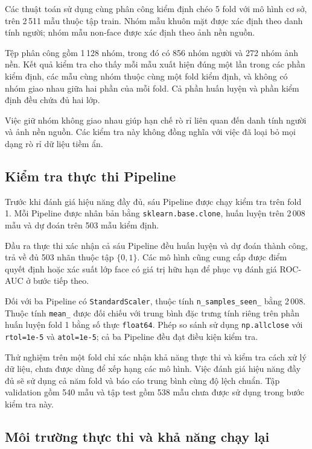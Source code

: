 \documentclass[12pt,a4paper,oneside]{report}
\begin{document}
Các thuật toán sử dụng cùng phân công kiểm định chéo
5 fold với mô hình cơ sở, trên 2\,511 mẫu thuộc tập train.
Nhóm mẫu khuôn mặt được xác định theo danh tính người;
nhóm mẫu non-face được xác định theo ảnh nền nguồn.

Tệp phân công gồm 1\,128 nhóm, trong đó có 856 nhóm người
và 272 nhóm ảnh nền. Kết quả kiểm tra cho thấy mỗi mẫu
xuất hiện đúng một lần trong các phần kiểm định,
các mẫu cùng nhóm thuộc cùng một fold kiểm định,
và không có nhóm giao nhau giữa hai phần của mỗi fold.
Cả phần huấn luyện và phần kiểm định đều chứa đủ hai lớp.

Việc giữ nhóm không giao nhau giúp hạn chế rò rỉ liên quan
đến danh tính người và ảnh nền nguồn. Các kiểm tra này
không đồng nghĩa với việc đã loại bỏ mọi dạng rò rỉ
dữ liệu tiềm ẩn.

\subsection{Kiểm tra thực thi Pipeline}

Trước khi đánh giá hiệu năng đầy đủ, sáu Pipeline được
chạy kiểm tra trên fold 1. Mỗi Pipeline được nhân bản
bằng \texttt{sklearn.base.clone}, huấn luyện trên
2\,008 mẫu và dự đoán trên 503 mẫu kiểm định.

Đầu ra thực thi xác nhận cả sáu Pipeline đều huấn luyện
và dự đoán thành công, trả về đủ 503 nhãn thuộc tập
$\{0,1\}$. Các mô hình cũng cung cấp được điểm quyết định
hoặc xác suất lớp face có giá trị hữu hạn để phục vụ
đánh giá ROC-AUC ở bước tiếp theo.

Đối với ba Pipeline có \texttt{StandardScaler},
thuộc tính \texttt{n\_samples\_seen\_} bằng 2\,008.
Thuộc tính \texttt{mean\_} được đối chiếu với trung bình
đặc trưng tính riêng trên phần huấn luyện fold 1
bằng số thực \texttt{float64}.
Phép so sánh sử dụng \texttt{np.allclose}
với \texttt{rtol=1e-5} và \texttt{atol=1e-5};
cả ba Pipeline đều đạt điều kiện kiểm tra.

Thử nghiệm trên một fold chỉ xác nhận khả năng thực thi
và kiểm tra cách xử lý dữ liệu, chưa được dùng để
xếp hạng các mô hình. Việc đánh giá hiệu năng đầy đủ
sẽ sử dụng cả năm fold và báo cáo trung bình cùng
độ lệch chuẩn. Tập validation gồm 540 mẫu và tập test
gồm 538 mẫu chưa được sử dụng trong bước kiểm tra này.
\subsection{Môi trường thực thi và khả năng chạy lại}
\end{document}
